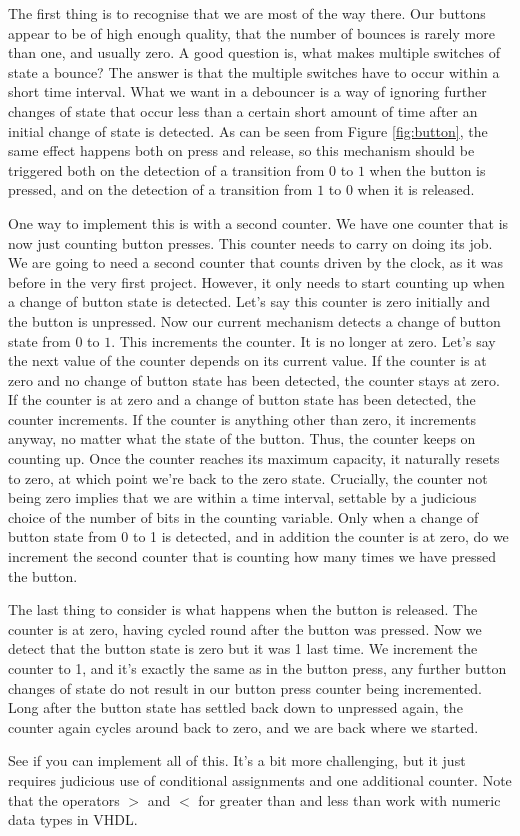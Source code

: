 \documentclass[../physical_computing.tex]{subfiles}
\begin{document}
The first thing is to recognise that we are most of the way there. Our buttons appear to be of high enough quality, that the number of bounces is rarely more than one, and usually zero. A good question is, what makes multiple switches of state a bounce? The answer is that the multiple switches have to occur within a short time interval. What we want in a debouncer is a way of ignoring further changes of state that occur less than a certain short amount of time after an initial change of state is detected. As can be seen from Figure \ref{fig:button}, the same effect happens both on press and release, so this mechanism should be triggered both on the detection of a transition from $0$ to $1$ when the button is pressed, and on the detection of a transition from $1$ to $0$ when it is released. 

One way to implement this is with a second counter. We have one counter that is now just counting button presses. This counter needs to carry on doing its job. We are going to need a second counter that counts driven by the clock, as it was before in the very first project. However, it only needs to start counting up when a change of button state is detected. Let's say this counter is zero initially and the button is unpressed. Now our current mechanism detects a change of button state from $0$ to $1$. This increments the counter. It is no longer at zero. Let's say the next value of the counter depends on its current value. If the counter is at zero and no change of button state has been detected, the counter stays at zero. If the counter is at zero and a change of button state has been detected, the counter increments. If the counter is anything other than zero, it increments anyway, no matter what the state of the button. Thus, the counter keeps on counting up. Once the counter reaches its maximum capacity, it naturally resets to zero, at which point we're back to the zero state. Crucially, the counter not being zero implies that we are within a time interval, settable by a judicious choice of the number of bits in the counting variable. Only when a change of button state from 0 to 1 is detected, and in addition the counter is at zero, do we increment the second counter that is counting how many times we have pressed the button.

The last thing to consider is what happens when the button is released. The counter is at zero, having cycled round after the button was pressed. Now we detect that the button state is zero but it was 1 last time. We increment the counter to 1, and it's exactly the same as in the button press, any further button changes of state do not result in our button press counter being incremented. Long after the button state has settled back down to unpressed again, the counter again cycles around back to zero, and we are back where we started.

See if you can implement all of this. It's a bit more challenging, but it just requires judicious use of conditional assignments and one additional counter. Note that the operators $>$ and $<$ for greater than and less than work with numeric data types in VHDL.
\end{document}
